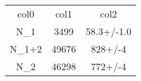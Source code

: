\begin{table}
\begin{tabular}{ccc}
col0 & col1 & col2 \\
N_1 & 3499 & 58.3+/-1.0 \\
N_{1+2} & 49676 & 828+/-4 \\
N_{2} & 46298 & 772+/-4 \\
\end{tabular}
\end{table}
